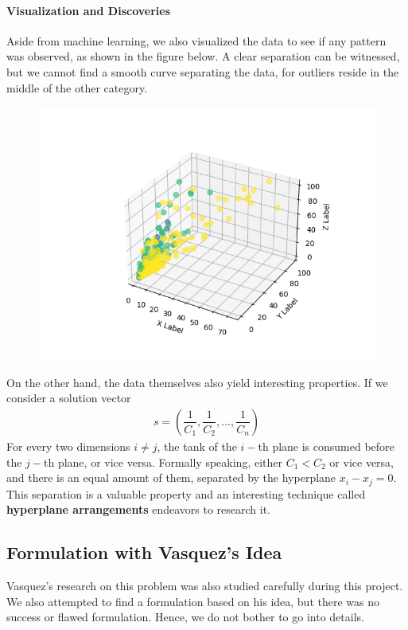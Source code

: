 \documentclass[12pt,letterpaper]{article}
\begin{document}
\paragraph{Visualization and Discoveries}
Aside from machine learning, we also visualized the data to see if any pattern was observed, as shown in the figure below. 
A clear separation can be witnessed, but we cannot find a smooth curve separating the data, for outliers reside 
in the middle of the other category. 
\begin{figure}[ht]
    \centering
    \includegraphics[scale=0.6]{3d_plot.png}
\end{figure}
On the other hand, the data themselves also yield interesting properties. If we consider a solution vector 
\begin{align*}
 s = \left( \dfrac{1}{C_1}, \dfrac{1}{C_2}, ..., \dfrac{1}{C_n} \right)
\end{align*}
For every two dimensions $ i \neq j$, the tank of the $i-$th plane is consumed before the $j-$th plane, or vice versa.
Formally speaking, either $C_1 < C_2$ or vice versa, and there is an equal amount of them, separated by the hyperplane 
$x_i - x_j = 0$. This separation is a valuable property and an interesting technique called \textbf{hyperplane arrangements} 
endeavors to research it.

\subsection{Formulation with Vasquez's Idea}
Vasquez's research \cite{vasquez2015airplane} on this problem was also studied carefully during this project. 
We also attempted to find a formulation based on his idea, but there was no success or flawed formulation. 
Hence, we do not bother to go into details. 
\end{document}
